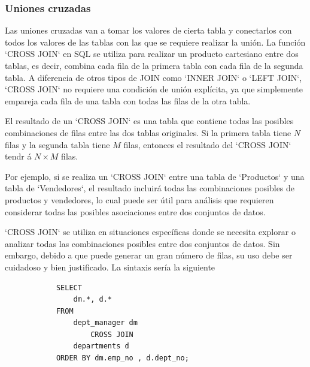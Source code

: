         \subsubsection{Uniones cruzadas}

        Las uniones cruzadas van a tomar los valores de cierta tabla y conectarlos con todos los valores de las tablas con las que se requiere realizar la unión. La función `CROSS JOIN` en SQL se utiliza para realizar un producto cartesiano entre dos tablas, es decir, combina cada fila de la primera tabla con cada fila de la segunda tabla. A diferencia de otros tipos de JOIN como `INNER JOIN` o `LEFT JOIN`, `CROSS JOIN` no requiere una condición de unión explícita, ya que simplemente empareja cada fila de una tabla con todas las filas de la otra tabla.

        El resultado de un `CROSS JOIN` es una tabla que contiene todas las posibles combinaciones de filas entre las dos tablas originales. Si la primera tabla tiene \( N \) filas y la segunda tabla tiene \( M \) filas, entonces el resultado del `CROSS JOIN` tendr   á \( N \times M \) filas. 
        
        Por ejemplo, si se realiza un `CROSS JOIN` entre una tabla de `Productos` y una tabla de `Vendedores`, el resultado incluirá todas las combinaciones posibles de productos y vendedores, lo cual puede ser útil para análisis que requieren considerar todas las posibles asociaciones entre dos conjuntos de datos.
        
        `CROSS JOIN` se utiliza en situaciones específicas donde se necesita explorar o analizar todas las combinaciones posibles entre dos conjuntos de datos. Sin embargo, debido a que puede generar un gran número de filas, su uso debe ser cuidadoso y bien justificado. La sintaxis sería la siguiente

        \begin{verbatim}
            SELECT 
                dm.*, d.*
            FROM
                dept_manager dm
                    CROSS JOIN
                departments d
            ORDER BY dm.emp_no , d.dept_no;
        \end{verbatim}


